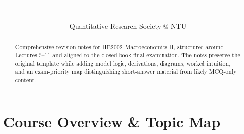 \documentclass[12pt]{article}
\title{%
\vspace{-0.5cm}
{\Large\bfseries \CourseCode\ \CourseName{} -- \DocType}
}
\author{Quantitative Research Society @ NTU}
\date{\AcademicYear}
\newcommand{\CourseCode}{HE2002}
\newcommand{\CourseName}{Macroeconomics II}
\begin{document}
\maketitle
\thispagestyle{plainfirst}

\begin{abstract}
\noindent
Comprehensive revision notes for \CourseCode\ \CourseName, structured around Lectures 5--11 and aligned to the closed-book final examination. The notes preserve the original template while adding model logic, derivations, diagrams, worked intuition, and an exam-priority map distinguishing short-answer material from likely MCQ-only content.
\end{abstract}

\vspace{0.5cm}
\newpage
\tableofcontents
\newpage

\fontsize{10.5pt}{11.5pt}\selectfont
\pagestyle{main}

\section*{Course Overview \& Topic Map}
\end{document}
